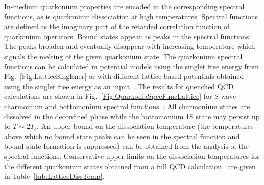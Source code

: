 In-medium quarkonium properties are encoded in the corresponding 
spectral functions, as is quarkonium dissociation
at high temperatures. Spectral functions are defined as
the imaginary part of the retarded correlation function of quarkonium
operators. Bound states appear as peaks in the spectral functions.
The peaks broaden and eventually disappear with increasing temperature which
signals the melting of the given quarkonium state.
The quarkonium spectral functions can be calculated in potential models 
using the singlet free energy from Fig.~\ref{Fig:LatticeSingEner} or with different 
lattice-based potentials obtained using the singlet free energy
as an input~\cite{Mocsy:2007yj,Mocsy:2007jz}. 
The results for quenched QCD calculations are shown in Fig.~\ref{Fig:QuarkoniaSpecFuncLattice}
for S-wave charmonium  and bottomonium 
spectral functions~\cite{Mocsy:2007yj}.
All charmonium states are dissolved in the deconfined phase while the bottomonium 1S
state may persist up to $T \sim 2T_c$. An upper bound on the dissociation temperature 
(the temperatures above which no
bound state peaks can be seen in the spectral function and bound state 
formation is suppressed) can be obtained from the analysis of the spectral 
functions. Conservative upper limits on the dissociation
temperatures for the different quarkonium states obtained from 
a full QCD calculation~\cite{Mocsy:2007jz} are given in Table~\ref{tab:LatticeDissTemp}.

